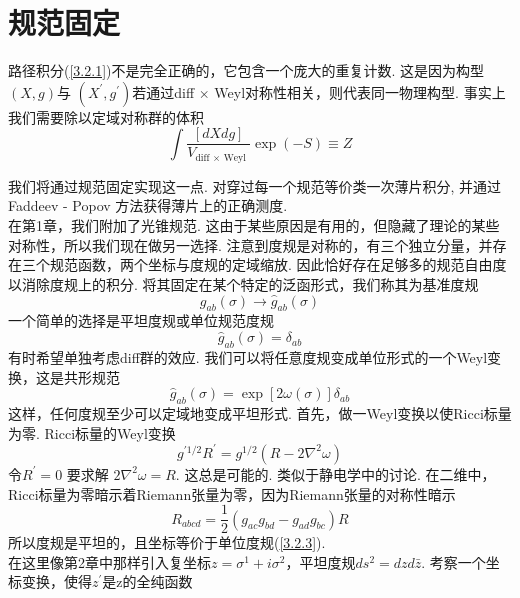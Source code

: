 \section{规范固定}%

路径积分(\ref{3.2.1})不是完全正确的，它包含一个庞大的重复计数. 这是因为构型$(X, g)$与 $\left(X^{\prime}, g^{\prime}\right)$若通过diff $\times$ Weyl对称性相关，则代表同一物理构型. 事实上我们需要除以定域对称群的体积
\begin{equation}\label{3.3.1}
\int \frac{[d X d g]}{V_{\text {diff } \times \text { Weyl }}} \exp (-S) \equiv Z
\end{equation}

我们将通过规范固定实现这一点.  对穿过每一个规范等价类一次薄片积分, 并通过 Faddeev - Popov 方法获得薄片上的正确测度. \\
在第1章，我们附加了光锥规范.  这由于某些原因是有用的，但隐藏了理论的某些对称性，所以我们现在做另一选择. 注意到度规是对称的，有三个独立分量，并存在三个规范函数，两个坐标与度规的定域缩放. 因此恰好存在足够多的规范自由度以消除度规上的积分. 将其固定在某个特定的泛函形式，我们称其为基准度规
\begin{equation}
g_{a b}(\sigma) \rightarrow \hat{g}_{a b}(\sigma)
\end{equation}
一个简单的选择是平坦度规或单位规范度规
\begin{equation}\label{3.3.3}
\hat{g}_{a b}(\sigma)=\delta_{a b}
\end{equation}
有时希望单独考虑diff群的效应. 我们可以将任意度规变成单位形式的一个Weyl变换，这是共形规范
\begin{equation}
\hat{g}_{a b}(\sigma)=\exp [2 \omega(\sigma)] \delta_{a b}
\end{equation}
这样，任何度规至少可以定域地变成平坦形式. 首先，做一Weyl变换以使Ricci标量为零. Ricci标量的Weyl变换
\begin{equation}\label{3.3.5}
g^{\prime 1 / 2} R^{\prime}=g^{1 / 2}\left(R-2 \nabla^{2} \omega\right)
\end{equation}
令$R^{\prime}=0$ 要求解 $2 \nabla^{2} \omega=R$. 这总是可能的. 类似于静电学中的讨论. 在二维中，Ricci标量为零暗示着Riemann张量为零，因为Riemann张量的对称性暗示
\begin{equation}
R_{a b c d}=\frac{1}{2}\left(g_{a c} g_{b d}-g_{a d} g_{b c}\right) R
\end{equation}
所以度规是平坦的，且坐标等价于单位度规(\ref{3.2.3}).\\
在这里像第2章中那样引入复坐标$z=\sigma^{1}+i \sigma^{2}$，平坦度规$d s^{2}=d z d \bar{z}$. 考察一个坐标变换，使得$z^\prime$是z的全纯函数
